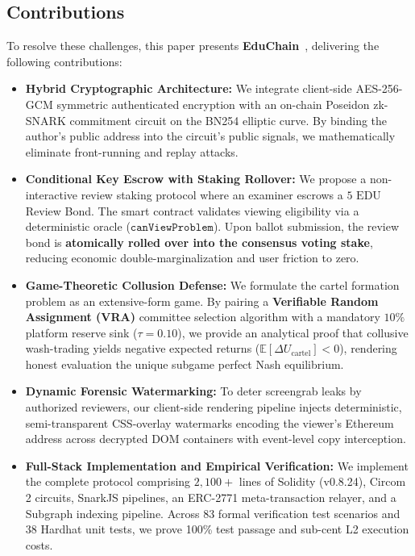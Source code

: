 \documentclass[conference,10pt]{IEEEtran}
\begin{document}
\subsection{Contributions}
To resolve these challenges, this paper presents \textbf{EduChain}~\cite{kim2026educhain}, delivering the following contributions:
\begin{itemize}
    \item \textbf{Hybrid Cryptographic Architecture:} We integrate client-side AES-256-GCM symmetric authenticated encryption with an on-chain Poseidon zk-SNARK commitment circuit on the BN254 elliptic curve. By binding the author's public address into the circuit's public signals, we mathematically eliminate front-running and replay attacks.
    \item \textbf{Conditional Key Escrow with Staking Rollover:} We propose a non-interactive review staking protocol where an examiner escrows a $5\text{ EDU}$ Review Bond. The smart contract validates viewing eligibility via a deterministic oracle ($\mathtt{canViewProblem}$). Upon ballot submission, the review bond is \textbf{atomically rolled over into the consensus voting stake}, reducing economic double-marginalization and user friction to zero.
    \item \textbf{Game-Theoretic Collusion Defense:} We formulate the cartel formation problem as an extensive-form game. By pairing a \textbf{Verifiable Random Assignment (VRA)} committee selection algorithm with a mandatory $10\%$ platform reserve sink ($\tau = 0.10$), we provide an analytical proof that collusive wash-trading yields negative expected returns ($\mathbb{E}[\Delta U_{\text{cartel}}] < 0$), rendering honest evaluation the unique subgame perfect Nash equilibrium.
    \item \textbf{Dynamic Forensic Watermarking:} To deter screengrab leaks by authorized reviewers, our client-side rendering pipeline injects deterministic, semi-transparent CSS-overlay watermarks encoding the viewer's Ethereum address across decrypted DOM containers with event-level copy interception.
    \item \textbf{Full-Stack Implementation and Empirical Verification:} We implement the complete protocol comprising $2,100+$ lines of Solidity (v0.8.24), Circom 2 circuits, SnarkJS pipelines, an ERC-2771 meta-transaction relayer, and a Subgraph indexing pipeline. Across 83 formal verification test scenarios and 38 Hardhat unit tests, we prove 100\% test passage and sub-cent L2 execution costs.
\end{itemize}
\end{document}
